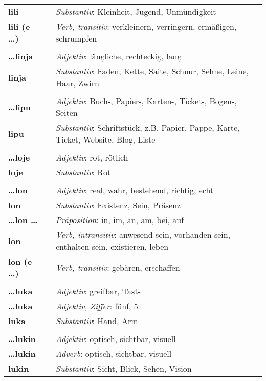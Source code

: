 \begin{supertabular}{p{2,5cm}|ll}
\textbf{lili} && \textit{Substantiv}: Kleinheit, Jugend, Unmündigkeit \\ 
\textbf{lili (e \dots)} && \textit{Verb, transitiv}: verkleinern, verringern, ermäßigen, schrumpfen\\ 
 && \\ %
\textbf{\dots linja} && \textit{Adjektiv}: längliche, rechteckig, lang \\ 
\textbf{linja} && \textit{Substantiv}: Faden, Kette, Saite, Schnur, Sehne, Leine, Haar, Zwirn \\ 
 && \\ %
\textbf{\dots lipu} && \textit{Adjektiv}: Buch-, Papier-, Karten-, Ticket-, Bogen-, Seiten- \\ 
\textbf{lipu} && \textit{Substantiv}: Schriftstück, z.B. Papier, Pappe, Karte, Ticket, Website, Blog, Liste \\ 
 && \\ %
\textbf{\dots loje} && \textit{Adjektiv}: rot, rötlich \\ 
\textbf{loje} && \textit{Substantiv}: Rot \\ 
 && \\ %
\textbf{\dots lon} && \textit{Adjektiv}: real, wahr, bestehend, richtig, echt \\ 
\textbf{lon} && \textit{Substantiv}: Existenz, Sein, Präsenz \\ 
\textbf{\dots lon \dots} && \textit{Präposition}: in, im, an, am, bei, auf \\ 
\textbf{lon} && \textit{Verb, intransitiv}: anwesend sein, vorhanden sein, enthalten sein, existieren, leben \\ 
\textbf{lon (e \dots)} && \textit{Verb, transitiv}: gebären, erschaffen \\ 
 && \\ %
\textbf{\dots luka} && \textit{Adjektiv}: greifbar, Tast- \\ 
\textbf{\dots luka} && \textit{Adjektiv, Ziffer}: fünf, 5 \\ 
\textbf{luka} && \textit{Substantiv}: Hand, Arm \\ 
 && \\ %
\textbf{\dots lukin} && \textit{Adjektiv}: optisch, sichtbar, visuell \\ 
\textbf{\dots lukin} && \textit{Adverb}: optisch, sichtbar, visuell \\ 
\textbf{lukin} && \textit{Substantiv}: Sicht, Blick, Sehen, Vision \\ 

\end{supertabular}
